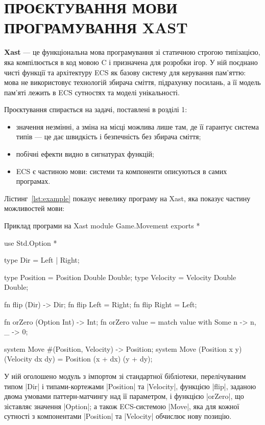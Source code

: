 \chapter{ПРОЄКТУВАННЯ МОВИ ПРОГРАМУВАННЯ XAST}

\textbf{Xast} --- це функціональна мова програмування зі статичною строгою типізацією,
яка компілюється в код мовою C і призначена для розробки ігор. У ній поєднано
чисті функції та архітектуру ECS як базову систему для керування пам'яттю: мова не використовує технологій збирача сміття, підрахунку посилань, а її модель пам'яті лежить в ECS сутностях та моделі унікальності.

Проєктування спирається на задачі, поставлені в розділі 1:
\begin{itemize}
    \item значення незмінні, а зміна на місці можлива лише там, де її гарантує
          система типів --- це дає швидкість і безпечність без збирача сміття;
    \item побічні ефекти видно в сигнатурах функцій;
    \item ECS є частиною мови: системи та компоненти описуються в самих програмах.
\end{itemize}

Лістинг~\ref{lst:example} показує невелику програму на Xast, яка показує частину можливостей мови:

\begin{xastlisting}[label=lst:example]{Приклад програми на Xast}
module Game.Movement exports *

use Std.Option *

type Dir = Left | Right;

type Position = Position Double Double;
type Velocity = Velocity Double Double;

fn flip (Dir) -> Dir;
fn flip Left = Right;
fn flip Right = Left;

fn orZero (Option Int) -> Int;
fn orZero value = match value with
    Some n -> n,
    _      -> 0;

system Move #(Position, Velocity) -> Position;
system Move (Position x y) (Velocity dx dy) =
    Position (x + dx) (y + dy);
\end{xastlisting}

У ній оголошено модуль з імпортом зі стандартної бібліотеки, перелічуваним типом \xast|Dir| і типами-кортежами \xast|Position| та \xast|Velocity|, функцією \xast|flip|, заданою двома умовами паттерн-матчингу над її параметром, і функцією \xast|orZero|, що зіставляє значення \xast|Option|; а також ECS-системою \xast|Move|, яка для кожної сутності з компонентами \xast|Position| та \xast|Velocity| обчислює нову позицію.

